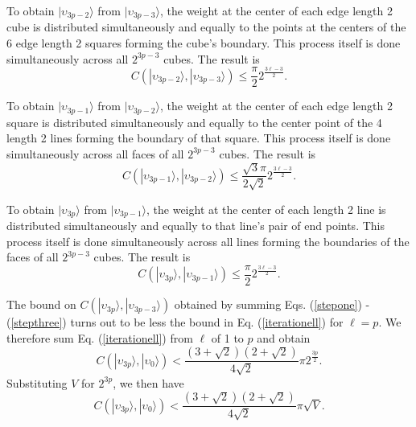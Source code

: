 \documentclass[12pt,amsmath,amssymb,onecolumn]{revtex4-2}
\begin{document}
To obtain $|\upsilon_{3p -2} \rangle $ from $|\upsilon_{3p -3} \rangle $,
the weight at the center of each edge length
2 cube is distributed simultaneously and equally
to the points at the centers of the 6
edge length 2 squares forming the cube's boundary.
This process itself is done simultaneously
across all $2^{3 p - 3}$ cubes.  The
result is
\begin{equation}
  \label{stepone}
C( |\upsilon_{3p -2} \rangle , |\upsilon_{3 p - 3} \rangle ) \le \frac{\pi}{2} 2^{\frac{3\ell - 3}{2}}.
\end{equation}

To obtain $|\upsilon_{3p -1} \rangle $ from $|\upsilon_{3p -2} \rangle $,
the weight at the center of each edge length 2
square is distributed 
simultaneously and equally to the 
center point of the 4 length 2 lines forming 
the boundary of that square. This process itself is done simultaneously
across all faces of all $2^{3 p - 3}$ cubes. 
The result is
\begin{equation}
  \label{steptwo}
C( |\upsilon_{3p -1} \rangle , |\upsilon_{3 p - 2} \rangle ) \le \frac{\sqrt{3}\pi}{2\sqrt{2}} 2^{\frac{3\ell - 3}{2}}.
\end{equation}

To obtain $|\upsilon_{3p} \rangle $ from $|\upsilon_{3p -1} \rangle $,
the weight at the center of each length  2 line
is distributed 
simultaneously and equally to that line's
pair of end points.
This process itself is done simultaneously
across all lines forming the boundaries of
the faces of all $2^{3 p - 3}$ cubes. 
The result is
\begin{equation}
  \label{stepthree}
C( |\upsilon_{3p} \rangle , |\upsilon_{3 p - 1} \rangle ) \le \frac{\pi}{2} 2^{\frac{3\ell - 3}{2}}.
\end{equation}


The bound on $C( |\upsilon_{3p} \rangle , |\upsilon_{3 p - 3} \rangle )$ obtained by summing
Eqs. (\ref{stepone}) - (\ref{stepthree}) turns out to be less the
bound in Eq. (\ref{iterationell}) for $\ell = p$.
We therefore sum Eq. (\ref{iterationell}) from $\ell$ of 1 to $p$ and obtain
\begin{equation}
\label{summedfanout}
C(|\upsilon_{3p} \rangle , |\upsilon_0 \rangle ) < \frac{(3 + \sqrt{2})(2+\sqrt{2})}{4\sqrt{2}}\pi 2^{\frac{3 p}{2}}.
\end{equation}
Substituting $V$ for $2^{3p}$, we then have
\begin{equation}
\label{summedfanout1}
C(|\upsilon_{3p} \rangle , |\upsilon_0 \rangle ) < \frac{(3 + \sqrt{2})(2 + \sqrt{2})}{4\sqrt{2}}\pi \sqrt{V}.
\end{equation}
\end{document}
